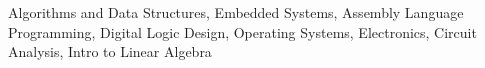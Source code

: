 Algorithms and Data Structures, Embedded Systems, Assembly Language Programming, Digital Logic Design, Operating Systems, Electronics, Circuit Analysis, Intro to Linear Algebra